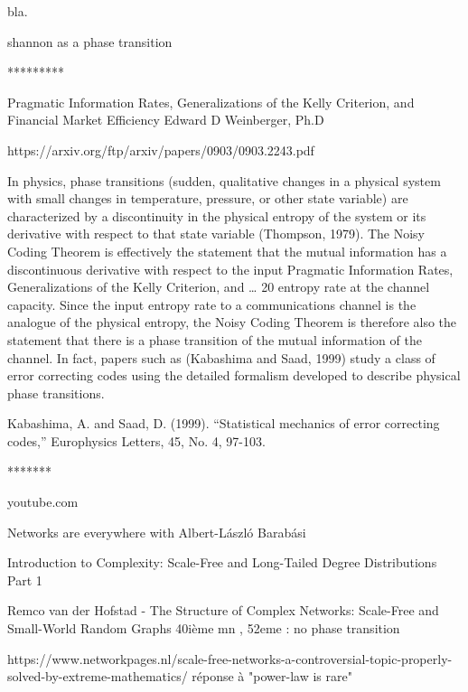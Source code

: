 \documentclass[a4paper]{article}
\begin{document}
bla.


shannon as a phase transition

*********

Pragmatic Information Rates, Generalizations of the
Kelly Criterion, and Financial Market Efficiency
Edward D Weinberger, Ph.D

https://arxiv.org/ftp/arxiv/papers/0903/0903.2243.pdf

In physics, phase transitions (sudden, qualitative changes in a physical system with small
changes in temperature, pressure, or other state variable) are characterized by a
discontinuity in the physical entropy of the system or its derivative with respect to that
state variable (Thompson, 1979). The Noisy Coding Theorem is effectively the statement
that the mutual information has a discontinuous derivative with respect to the input 
Pragmatic Information Rates, Generalizations of the Kelly Criterion, and … 20
entropy rate at the channel capacity. Since the input entropy rate to a communications
channel is the analogue of the physical entropy, the Noisy Coding Theorem is therefore
also the statement that there is a phase transition of the mutual information of the
channel. In fact, papers such as (Kabashima and Saad, 1999) study a class of error
correcting codes using the detailed formalism developed to describe physical phase
transitions.

Kabashima, A. and Saad, D. (1999). “Statistical mechanics of error correcting codes,”
Europhysics Letters, 45, No. 4, 97-103.


*******


youtube.com

Networks are everywhere with Albert-László Barabási

Introduction to Complexity: Scale-Free and Long-Tailed Degree Distributions Part 1

Remco van der Hofstad - The Structure of Complex Networks: Scale-Free and Small-World Random Graphs   40ième mn , 52eme : no phase transition

https://www.networkpages.nl/scale-free-networks-a-controversial-topic-properly-solved-by-extreme-mathematics/
réponse à "power-law is rare"




\end{document}
